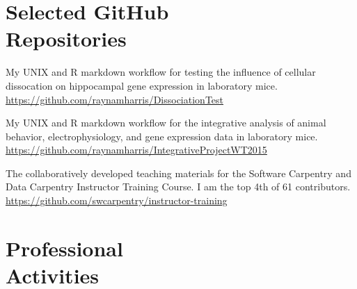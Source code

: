 \documentclass[margin,line]{resume}
\begin{document}
\begin{resume}

\section{\mysidestyle Selected GitHub \\Repositories}

\begin{description}
\setlength{\itemsep}{3pt}
\item [\href{https://github.com/raynamharris/DissociationTest}{DissociationTest}] My UNIX and R markdown workflow for testing the influence of cellular dissocation on hippocampal gene expression in laboratory mice.\\ \url{https://github.com/raynamharris/DissociationTest}
\item [\href{https://github.com/raynamharris/IntegrativeProjectWT2015}{IntegrativeProjectWT2015}] My UNIX and R markdown workflow for the integrative analysis of animal behavior, electrophysiology, and gene expression data in laboratory mice. \\ \url{https://github.com/raynamharris/IntegrativeProjectWT2015}
\item [\href{https://github.com/swcarpentry/instructor-training}{instructor-training}] The collaboratively developed teaching materials for the Software Carpentry and Data Carpentry Instructor Training Course. I am the top 4th of 61 contributors. \\ \url{https://github.com/swcarpentry/instructor-training}

\end{description}


    
\section{\mysidestyle Professional\\Activities}


\end{resume}
\end{document}
